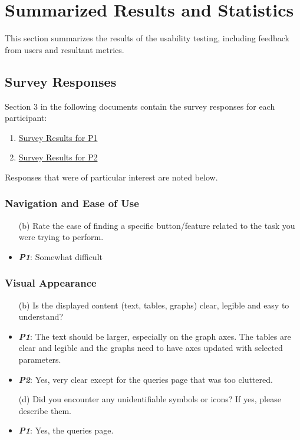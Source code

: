 \documentclass{article}
\begin{document}
\section{Summarized Results and Statistics}
This section summarizes the results of the usability testing, including feedback
from users and resultant metrics.

\subsection{Survey Responses}
Section 3 in the following documents contain the survey responses for each
participant:
\begin{enumerate}
    \item
    \href{https://github.com/SumanyaG/Alkalytics/blob/main/docs/UsabilityTestingReport/Survey/SurveyResults/CharlesDeLannoy/UsabilityTestingSurveyDeLannoy.pdf}{Survey Results for P1}
    \item
    \href{https://github.com/SumanyaG/Alkalytics/blob/main/docs/UsabilityTestingReport/Survey/SurveyResults/MeghnaSaha/UsabilityTestingSurveySaha.pdf}{Survey
    Results for P2}
\end{enumerate}

Responses that were of particular interest are noted below.

\subsubsection{Navigation and Ease of Use}
\begin{itemize}
    \item[(b)] Rate the ease of finding a specific button/feature related to the
    task you were trying to perform.
    \item \textbf{\emph{P1}}: Somewhat difficult
\end{itemize}

\subsubsection{Visual Appearance}
\begin{itemize}
    \item[(b)] Is the displayed content (text, tables, graphs) clear, legible
    and easy to understand?
    \item \textbf{\emph{P1}}: The text should be larger, especially on the graph axes. The
    tables are clear and legible and the graphs need to have axes updated
    with selected parameters.
    \item \textbf{\emph{P2}}: Yes, very clear except for the queries page that was too
    cluttered.
    \item[(d)] Did you encounter any unidentifiable symbols or icons? If yes,
    please describe them.
    \item \textbf{\emph{P1}}: Yes, the queries page.
\end{itemize}
\end{document}
